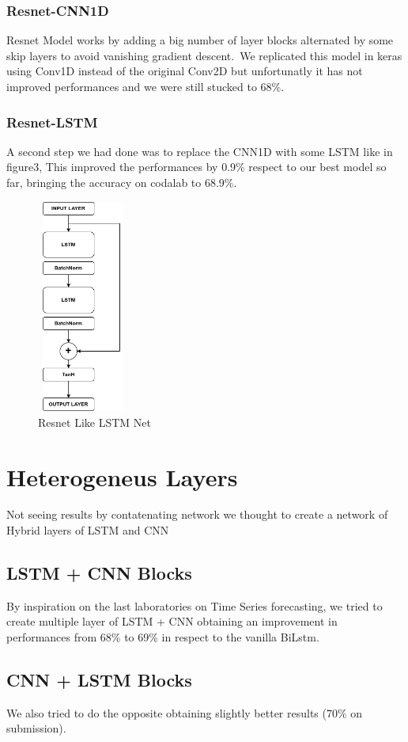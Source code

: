 \documentclass[11pt]{article}
\begin{document}
\subsubsection{Resnet-CNN1D}
Resnet Model works by adding a big number of layer blocks alternated by some skip layers to avoid vanishing gradient descent.\
We replicated this model in keras using Conv1D instead of the original Conv2D but unfortunatly it has not improved performances and we were still stucked to 68\%.
\subsubsection{Resnet-LSTM}
A second step we had done was to replace the CNN1D with some LSTM like in figure3,
This improved the performances by 0.9\% respect to our best model so far, bringing the accuracy on codalab to 68.9\%.
\begin{figure}[h]
\centering
\includegraphics[width=3cm, height=7cm,angle =90]{resnet}
\caption{Resnet Like LSTM Net}
\end{figure}

\section{Heterogeneus Layers}
Not seeing results by contatenating network we thought to create a network of Hybrid layers of LSTM and CNN
\subsection{LSTM + CNN Blocks}
By inspiration on the last laboratories on Time Series forecasting, we tried to create multiple layer of LSTM + CNN
obtaining an improvement in performances from 68\% to 69\% in respect to the vanilla BiLstm.
\subsection{CNN + LSTM Blocks}
We also tried to do the opposite obtaining slightly better results (70\% on submission).
\end{document}
